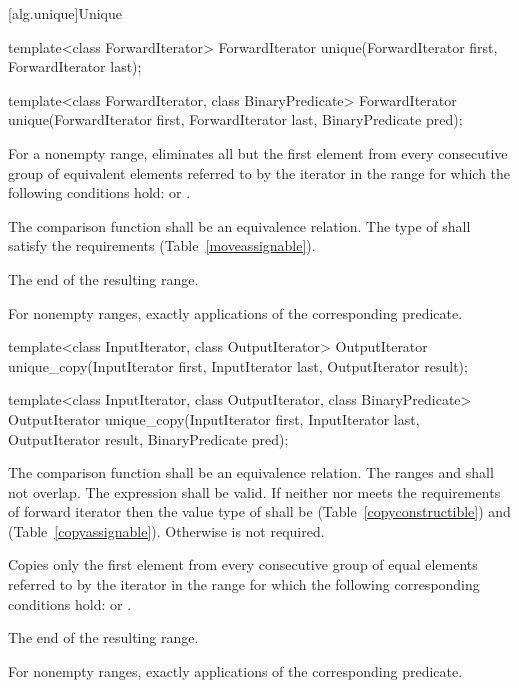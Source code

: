 [alg.unique]{Unique}

%
\begin{itemdecl}
template<class ForwardIterator>
  ForwardIterator unique(ForwardIterator first, ForwardIterator last);

template<class ForwardIterator, class BinaryPredicate>
  ForwardIterator unique(ForwardIterator first, ForwardIterator last,
                         BinaryPredicate pred);
\end{itemdecl}

\begin{itemdescr}
\pnum
\effects
For a nonempty range, eliminates all but the first element from every
consecutive group of equivalent elements referred to by the iterator
in the range
for which the following conditions hold:
or
.

\pnum
\requires
The comparison function shall be an equivalence relation.
The type of  shall satisfy the
 requirements (Table~\ref{moveassignable}).

\pnum
\returns
The end of the resulting range.

\pnum
\complexity
For nonempty ranges, exactly
applications of the corresponding predicate.
\end{itemdescr}

%
\begin{itemdecl}
template<class InputIterator, class OutputIterator>
  OutputIterator
    unique_copy(InputIterator first, InputIterator last,
                OutputIterator result);

template<class InputIterator, class OutputIterator,
         class BinaryPredicate>
  OutputIterator
    unique_copy(InputIterator first, InputIterator last,
                OutputIterator result, BinaryPredicate pred);
\end{itemdecl}


\begin{itemdescr}
\pnum
\requires
The comparison function shall be an equivalence relation.
The ranges
and
shall not overlap. The expression
shall be valid. If neither
nor
meets the requirements of forward iterator then the value type of
shall be  (Table~\ref{copyconstructible}) and
 (Table~\ref{copyassignable}).
Otherwise  is not required.

\pnum
\effects
Copies only the first element from every consecutive group of equal elements referred to by
the iterator
in the range
for which the following corresponding conditions hold:
or
.

\pnum
\returns
The end of the resulting range.

\pnum
\complexity
For nonempty ranges, exactly
applications of the corresponding predicate.
\end{itemdescr}

